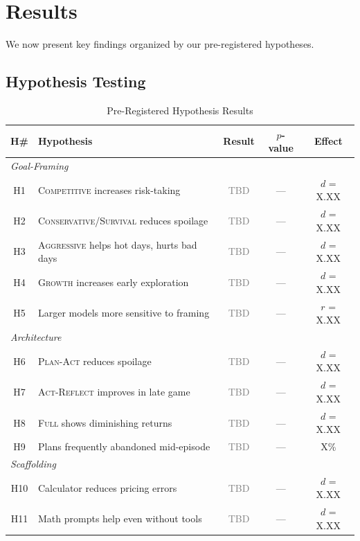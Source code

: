 \section{Results}
\label{sec:results}

We now present key findings organized by our pre-registered hypotheses.

\subsection{Hypothesis Testing}
\label{sec:hypothesis-results}

\begin{table}[h]
\centering
\caption{Pre-Registered Hypothesis Results}
\label{tab:hypotheses}
\small
\begin{tabular}{@{}cp{6.5cm}ccc@{}}
\toprule
\textbf{H\#} & \textbf{Hypothesis} & \textbf{Result} & \textbf{$p$-value} & \textbf{Effect} \\
\midrule
\multicolumn{5}{l}{\emph{Goal-Framing}} \\
H1 & \textsc{Competitive} increases risk-taking & \textcolor{gray}{TBD} & --- & $d$ = X.XX \\
H2 & \textsc{Conservative}/\textsc{Survival} reduces spoilage & \textcolor{gray}{TBD} & --- & $d$ = X.XX \\
H3 & \textsc{Aggressive} helps hot days, hurts bad days & \textcolor{gray}{TBD} & --- & $d$ = X.XX \\
H4 & \textsc{Growth} increases early exploration & \textcolor{gray}{TBD} & --- & $d$ = X.XX \\
H5 & Larger models more sensitive to framing & \textcolor{gray}{TBD} & --- & $r$ = X.XX \\
\midrule
\multicolumn{5}{l}{\emph{Architecture}} \\
H6 & \textsc{Plan-Act} reduces spoilage & \textcolor{gray}{TBD} & --- & $d$ = X.XX \\
H7 & \textsc{Act-Reflect} improves in late game & \textcolor{gray}{TBD} & --- & $d$ = X.XX \\
H8 & \textsc{Full} shows diminishing returns & \textcolor{gray}{TBD} & --- & $d$ = X.XX \\
H9 & Plans frequently abandoned mid-episode & \textcolor{gray}{TBD} & --- & X\% \\
\midrule
\multicolumn{5}{l}{\emph{Scaffolding}} \\
H10 & Calculator reduces pricing errors & \textcolor{gray}{TBD} & --- & $d$ = X.XX \\
H11 & Math prompts help even without tools & \textcolor{gray}{TBD} & --- & $d$ = X.XX \\

\end{tabular}
\end{table}
